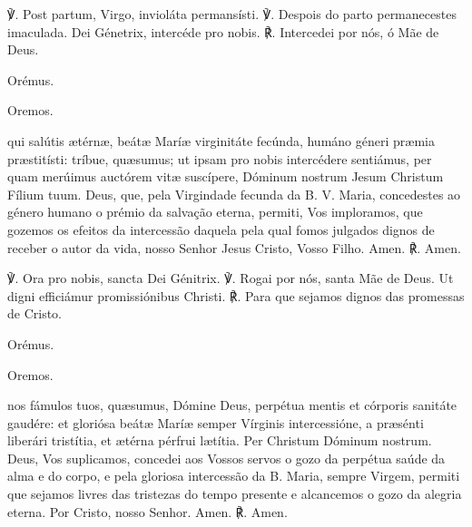 \pagebreak[3]\begin{nscenter}\emph{}\end{nscenter}

\begin{paracol}{2}
{\redx ℣.} Post partum, Virgo, invioláta permansísti.
\switchcolumn
{\redx ℣.} Despois do parto permanecestes imaculada.
 Dei Génetrix, intercéde pro nobis.
\switchcolumn
{\redx ℟.} Intercedei por nós, ó Mãe de Deus.
\switchcolumn*
\begin{nscenter} {\redx Orémus.} \end{nscenter}
\switchcolumn
\begin{nscenter} {\redx Oremos.} \end{nscenter}
\switchcolumn*
{} qui salútis ætérnæ, beátæ Maríæ virginitáte fecúnda, humáno géneri præmia præstitísti: tríbue, quæsumus; ut ipsam pro nobis intercédere sentiámus, per quam merúimus auctórem vitæ suscípere, Dóminum nostrum Jesum Christum Fílium tuum.
\switchcolumn
{} Deus, que, pela Virgindade fecunda da B. V. Maria, concedestes ao género humano o prémio da salvação eterna, permiti, Vos imploramos, que gozemos os efeitos da intercessão daquela pela qual fomos julgados dignos de receber o autor da vida, nosso Senhor Jesus Cristo, Vosso Filho.
 Amen.
\switchcolumn
{\redx ℟.} Amen.
\end{paracol}

\begin{nscenter}\emph{}\end{nscenter}

\begin{paracol}{2}
{\redx ℣.} Ora pro nobis, sancta Dei Génitrix.
\switchcolumn
{\redx ℣.} Rogai por nós, santa Mãe de Deus.
 Ut digni efficiámur promissiónibus Christi.
\switchcolumn
{\redx ℟.} Para que sejamos dignos das promessas de Cristo.
\switchcolumn*
\begin{nscenter} {\redx Orémus.} \end{nscenter}
\switchcolumn
\begin{nscenter} {\redx Oremos.} \end{nscenter}
\switchcolumn*
{} nos fámulos tuos, quæsumus, Dómine Deus, perpétua mentis et córporis sanitáte gaudére: et gloriósa beátæ Maríæ semper Vírginis intercessióne, a præsénti liberári tristítia, et ætérna pérfrui lætítia. Per Christum Dóminum nostrum.
\switchcolumn
{} Deus, Vos suplicamos, concedei aos Vossos servos o gozo da perpétua saúde da alma e do corpo, e pela gloriosa intercessão da B. Maria, sempre Virgem, permiti que sejamos livres das tristezas do tempo presente e alcancemos o gozo da alegria eterna. Por Cristo, nosso Senhor.
 Amen.
\switchcolumn
{\redx ℟.} Amen.
\end{paracol}


